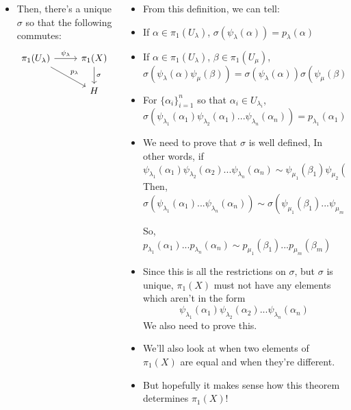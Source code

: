\documentclass[8pt]{beamer}
\begin{document}
\begin{frame}
\begin{columns}
\begin{column}[T]{0.5\textwidth}
\begin{itemize}
          \item<6-> Then, there's a unique $\sigma$ so that the following commutes:
            \[\begin{tikzcd}[ampersand replacement=\&]
                \pi_1(U_\lambda) \ar[rd, "p_\lambda"] \ar[r, "\psi_\lambda"] \&
                \pi_1(X) \ar[d, "\sigma"] \\
                  \& H
              \end{tikzcd}\]
        \end{itemize}
      \end{column}
      \begin{column}[T]{0.5\textwidth}
        \begin{itemize}
          \item<7-> From this definition, we can tell:
          \item<8-> If $\alpha \in \pi_1(U_\lambda)$, $\sigma(\psi_\lambda(\alpha)) = p_\lambda(\alpha)$
          \item<9-> If $\alpha \in \pi_1(U_\lambda)$, $\beta \in \pi_1(U_\mu)$,
            \[\sigma(\psi_\lambda(\alpha)\psi_\mu(\beta)) =
            \sigma(\psi_\lambda(\alpha))\sigma(\psi_\mu(\beta)) =
            p_\lambda(\alpha)p_\mu(\beta)\]
          \item<10-> For $\{\alpha_i\}_{i=1}^n$ so that $\alpha_i \in U_{\lambda_i}$,
            \[\sigma(\psi_{\lambda_1}(\alpha_1)\psi_{\lambda_2}(\alpha_1) ...
            \psi_{\lambda_n}(\alpha_n)) = p_{\lambda_1}(\alpha_1)p_{\lambda_2}(
            \alpha_2) ... p_{\lambda_n}(\alpha_n)\]
          \item<11-> We need to prove that $\sigma$ is well defined, In other words,
            if
            \[\psi_{\lambda_1}(\alpha_1) \psi_{\lambda_2}(\alpha_2) ...
              \psi_{\lambda_n}(\alpha_n) \sim \psi_{\mu_1}(\beta_1)
              \psi_{\mu_2}(\beta_2) ... \psi_{\mu_m}(\beta_m)\]
            Then, $\sigma(\psi_{\lambda_1}(\alpha_1) ...
              \psi_{\lambda_n}(\alpha_n)) \sim \sigma(\psi_{\mu_1}(\beta_1) ...
              \psi_{\mu_m}(\beta_m))$
 
            So, \quad \quad \ \ $p_{\lambda_1}(\alpha_1) ... p_{\lambda_n}(\alpha_n)
              \sim p_{\mu_1}(\beta_1) ... p_{\mu_m}(\beta_m)$
          \item<12-> Since this is all the restrictions on $\sigma$, but $\sigma$ is
            unique, $\pi_1(X)$ must not have any elements which aren't in the
            form
              \[\psi_{\lambda_1}(\alpha_1) \psi_{\lambda_2}(\alpha_2) ...
              \psi_{\lambda_n}(\alpha_n)\]
            We also need to prove this.
          \item<13-> We'll also look at when two elements of $\pi_1(X)$ are equal and
            when they're different.
          \item<14-> But hopefully it makes sense how this theorem determines
            $\pi_1(X)$!
        \end{itemize}
      \end{column}
    \end{columns}
  \end{frame}
\end{document}
